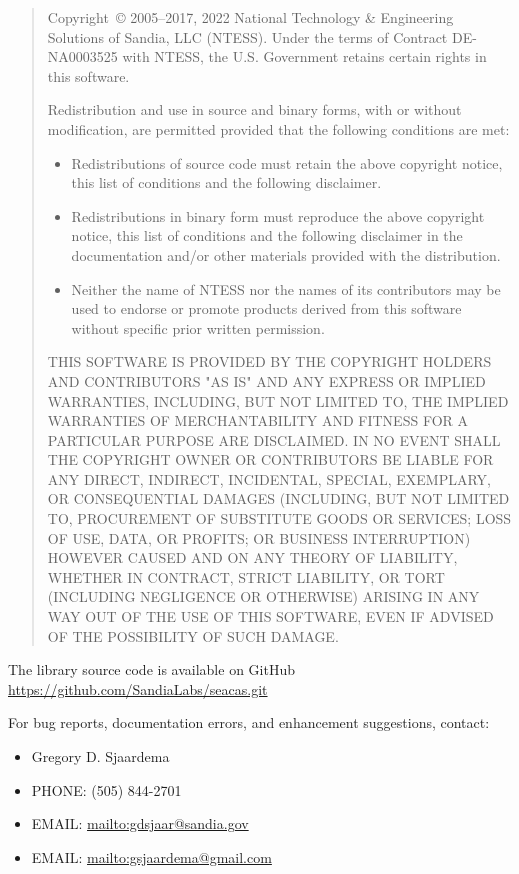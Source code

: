 \begin{quote}
Copyright~\copyright{} 2005--2017, 2022 National Technology \& Engineering Solutions
of Sandia, LLC (NTESS).  Under the terms of Contract DE-NA0003525 with
NTESS, the U.S. Government retains certain rights in this software.

Redistribution and use in source and binary forms, with or without
modification, are permitted provided that the following conditions are
met:

\begin{itemize}
\item Redistributions of source code must retain the above copyright
      notice, this list of conditions and the following disclaimer.

\item Redistributions in binary form must reproduce the above
      copyright notice, this list of conditions and the following
      disclaimer in the documentation and/or other materials provided
      with the distribution.

\item Neither the name of NTESS nor the names of its
      contributors may be used to endorse or promote products derived
      from this software without specific prior written permission.
\end{itemize}

THIS SOFTWARE IS PROVIDED BY THE COPYRIGHT HOLDERS AND CONTRIBUTORS
"AS IS" AND ANY EXPRESS OR IMPLIED WARRANTIES, INCLUDING, BUT NOT
LIMITED TO, THE IMPLIED WARRANTIES OF MERCHANTABILITY AND FITNESS FOR
A PARTICULAR PURPOSE ARE DISCLAIMED. IN NO EVENT SHALL THE COPYRIGHT
OWNER OR CONTRIBUTORS BE LIABLE FOR ANY DIRECT, INDIRECT, INCIDENTAL,
SPECIAL, EXEMPLARY, OR CONSEQUENTIAL DAMAGES (INCLUDING, BUT NOT
LIMITED TO, PROCUREMENT OF SUBSTITUTE GOODS OR SERVICES; LOSS OF USE,
DATA, OR PROFITS; OR BUSINESS INTERRUPTION) HOWEVER CAUSED AND ON ANY
THEORY OF LIABILITY, WHETHER IN CONTRACT, STRICT LIABILITY, OR TORT
(INCLUDING NEGLIGENCE OR OTHERWISE) ARISING IN ANY WAY OUT OF THE USE
OF THIS SOFTWARE, EVEN IF ADVISED OF THE POSSIBILITY OF SUCH DAMAGE.
\end{quote}

The \exo{} library source code is available on GitHub
\url{https://github.com/SandiaLabs/seacas.git}

For bug reports, documentation errors, and enhancement suggestions,
contact:
\begin{itemize}
   \item Gregory D. Sjaardema
   \item PHONE: (505) 844-2701
   \item EMAIL: \url{mailto:gdsjaar@sandia.gov}
   \item EMAIL: \url{mailto:gsjaardema@gmail.com}
\end{itemize}
